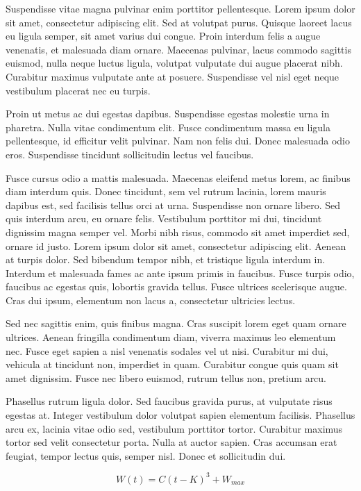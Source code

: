 Suspendisse vitae magna pulvinar enim porttitor pellentesque. Lorem ipsum dolor sit amet, consectetur adipiscing elit. Sed at volutpat purus. Quisque laoreet lacus eu ligula semper, sit amet varius dui congue. Proin interdum felis a augue venenatis, et malesuada diam ornare. Maecenas pulvinar, lacus commodo sagittis euismod, nulla neque luctus ligula, volutpat vulputate dui augue placerat nibh. Curabitur maximus vulputate ante at posuere. Suspendisse vel nisl eget neque vestibulum placerat nec eu turpis.

Proin ut metus ac dui egestas dapibus. Suspendisse egestas molestie urna in pharetra. Nulla vitae condimentum elit. Fusce condimentum massa eu ligula pellentesque, id efficitur velit pulvinar. Nam non felis dui. Donec malesuada odio eros. Suspendisse tincidunt sollicitudin lectus vel faucibus.

Fusce cursus odio a mattis malesuada. Maecenas eleifend metus lorem, ac finibus diam interdum quis. Donec tincidunt, sem vel rutrum lacinia, lorem mauris dapibus est, sed facilisis tellus orci at urna. Suspendisse non ornare libero. Sed quis interdum arcu, eu ornare felis. Vestibulum porttitor mi dui, tincidunt dignissim magna semper vel. Morbi nibh risus, commodo sit amet imperdiet sed, ornare id justo. Lorem ipsum dolor sit amet, consectetur adipiscing elit. Aenean at turpis dolor. Sed bibendum tempor nibh, et tristique ligula interdum in. Interdum et malesuada fames ac ante ipsum primis in faucibus. Fusce turpis odio, faucibus ac egestas quis, lobortis gravida tellus. Fusce ultrices scelerisque augue. Cras dui ipsum, elementum non lacus a, consectetur ultricies lectus.

Sed nec sagittis enim, quis finibus magna. Cras suscipit lorem eget quam ornare ultrices. Aenean fringilla condimentum diam, viverra maximus leo elementum nec. Fusce eget sapien a nisl venenatis sodales vel ut nisi. Curabitur mi dui, vehicula at tincidunt non, imperdiet in quam. Curabitur congue quis quam sit amet dignissim. Fusce nec libero euismod, rutrum tellus non, pretium arcu.

Phasellus rutrum ligula dolor. Sed faucibus gravida purus, at vulputate risus egestas at. Integer vestibulum dolor volutpat sapien elementum facilisis. Phasellus arcu ex, lacinia vitae odio sed, vestibulum porttitor tortor. Curabitur maximus tortor sed velit consectetur porta. Nulla at auctor sapien. Cras accumsan erat feugiat, tempor lectus quis, semper nisl. Donec et sollicitudin dui.

\begin{equation}
W(t) = C(t-K)^{3} + W_{max}
\end{equation}

